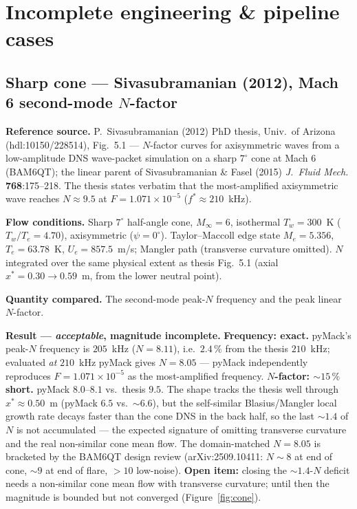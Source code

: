 \documentclass[11pt]{article}
\begin{document}
\FloatBarrier
\section{Incomplete engineering \& pipeline cases}
\label{sec:incomplete}


\subsection{Sharp cone --- Sivasubramanian (2012), Mach 6 second-mode $N$-factor}
\label{sec:cone}

\textbf{Reference source.} P.~Sivasubramanian (2012) PhD thesis, Univ.\ of
Arizona (hdl:10150/228514), Fig.~5.1 --- $N$-factor curves for axisymmetric
waves from a low-amplitude DNS wave-packet simulation on a sharp $7^\circ$ cone
at Mach 6 (BAM6QT); the linear parent of Sivasubramanian \& Fasel (2015)
\emph{J.\ Fluid Mech.} \textbf{768}:175--218. The thesis states verbatim that the
most-amplified axisymmetric wave reaches $N\approx9.5$ at $F=1.071\times10^{-5}$
($f^\ast\approx210$~kHz).

\textbf{Flow conditions.} Sharp $7^\circ$ half-angle cone, $M_\infty=6$,
isothermal $T_w=300$~K ($T_w/T_e=4.70$), axisymmetric ($\psi=0^\circ$).
Taylor--Maccoll edge state $M_e=5.356$, $T_e=63.78$~K, $U_e=857.5$~m/s;
Mangler path (transverse curvature omitted). $N$ integrated over the same
physical extent as thesis Fig.~5.1 (axial $x^\ast=0.30\to0.59$~m, from the lower
neutral point).

\textbf{Quantity compared.} The second-mode peak-$N$ frequency and the peak
linear $N$-factor.

\textbf{Result --- \emph{acceptable}, magnitude incomplete.} \textbf{Frequency:
exact.} pyMack's peak-$N$ frequency is $205$~kHz ($N=8.11$), i.e.\ $2.4\,\%$ from
the thesis $210$~kHz; evaluated \emph{at} $210$~kHz pyMack gives $N=8.05$ ---
pyMack independently reproduces $F=1.071\times10^{-5}$ as the most-amplified
frequency. \textbf{$N$-factor: $\sim\!15\,\%$ short.} pyMack $8.0$--$8.1$ vs.\
thesis $9.5$. The shape tracks the thesis well through $x^\ast\approx0.50$~m
(pyMack $6.5$ vs.\ $\sim\!6.6$), but the self-similar Blasius/Mangler local growth
rate decays faster than the cone DNS in the back half, so the last $\sim\!1.4$ of
$N$ is not accumulated --- the expected signature of omitting transverse curvature
and the real non-similar cone mean flow. The domain-matched $N=8.05$ is bracketed
by the BAM6QT design review (arXiv:2509.10411: $N\!\sim\!8$ at end of cone,
$\sim\!9$ at end of flare, $>\!10$ low-noise). \textbf{Open item:} closing the
$\sim\!1.4$-$N$ deficit needs a non-similar cone mean flow with transverse
curvature; until then the magnitude is bounded but not converged
(Figure~\ref{fig:cone}).
\end{document}
